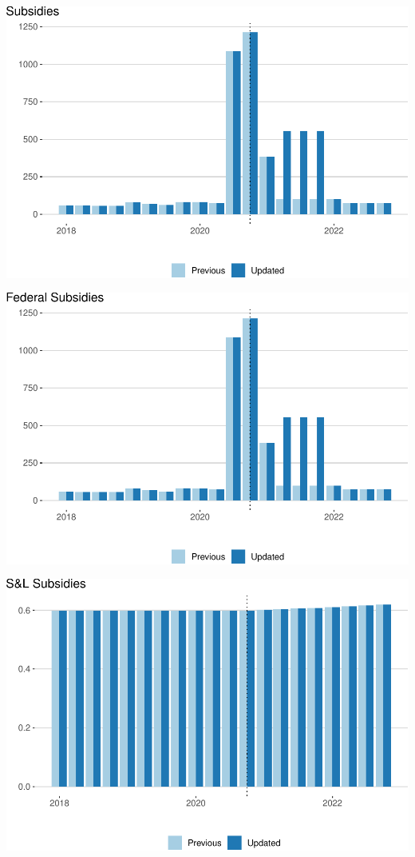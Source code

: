 \documentclass[
]{article}
\begin{document}
\begin{center}\includegraphics{update-changes-levels_files/figure-latex/subsidies-1} \end{center}

\begin{center}\includegraphics{update-changes-levels_files/figure-latex/subsidies_federal-1} \end{center}

\begin{center}\includegraphics{update-changes-levels_files/figure-latex/subsidies_state-1} \end{center}
\end{document}
